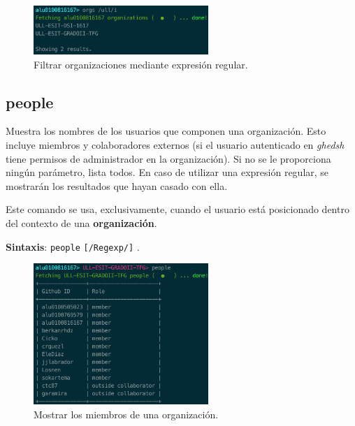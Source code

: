 \begin{figure}[H]
	\begin{center}
	\includegraphics[width=0.59\textwidth]{images/show-orgs-regexp.png}
	\caption{Filtrar organizaciones mediante expresión regular.}
	\label{fig:show-orgs-regexp}
	\end{center}
\end{figure}

\subsection{people}
\label{3.3.15}

Muestra los nombres de los usuarios que componen una organización. Esto incluye miembros y colaboradores externos (si el usuario autenticado en {\it ghedsh} tiene permisos de administrador en la organización).
Si no se le proporciona ningún parámetro, lista todos. En caso de utilizar una expresión regular, se mostrarán los resultados que hayan casado con ella.

Este comando se usa, exclusivamente, cuando el usuario está posicionado dentro del contexto de una \textbf{organización}.

\textbf{Sintaxis}: \verb|people| \verb|[/Regexp/]| .

\begin{figure}[H]
	\begin{center}
	\includegraphics[width=0.59\textwidth]{images/org-people.png}
	\caption{Mostrar los miembros de una organización.}
	\label{fig:org-people}
	\end{center}
\end{figure}

